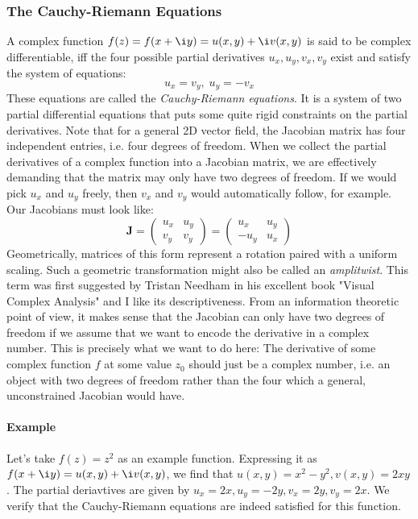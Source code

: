 \subsubsection{The Cauchy-Riemann Equations}
A complex function $f(z) = f(x + \i y) = u(x,y) + \i v(x,y)$ is said to be complex differentiable, iff the four possible partial derivatives $u_x, u_y, v_x, v_y$ exist and satisfy the system of equations:
\begin{equation}
 u_x = v_y, \; u_y = -v_x
\end{equation}
These equations are called the \emph{Cauchy-Riemann equations}. It is a system of two partial differential equations that puts some quite rigid constraints on the partial derivatives. Note that for a general 2D vector field, the Jacobian matrix has four independent entries, i.e. four degrees of freedom. When we collect the partial derivatives of a complex function into a Jacobian matrix, we are effectively demanding that the matrix may only have two degrees of freedom. If we would pick $u_x$ and $u_y$ freely, then $v_x$ and $v_y$ would automatically follow, for example. Our Jacobians must look like:
\begin{equation}
 \mathbf{J} = \begin{pmatrix} u_x & u_y \\	 v_y & v_y \end{pmatrix}
            = \begin{pmatrix} u_x & u_y \\	-u_y & u_x \end{pmatrix}
\end{equation}
Geometrically, matrices of this form represent a rotation paired with a uniform scaling. Such a geometric transformation might also be called an \emph{amplitwist}. This term was first suggested by Tristan Needham in his excellent book "Visual Complex Analysis" and I like its descriptiveness. From an information theoretic point of view, it makes sense that the Jacobian can only have two degrees of freedom if we assume that we want to encode the derivative in a complex number. This is precisely what we want to do here: The derivative of some complex function $f$ at some value $z_0$ should just be a complex number, i.e. an object with two degrees of freedom rather than the four which a general, unconstrained Jacobian would have.

\paragraph{Example} Let's take $f(z) = z^2$ as an example function. Expressing it as $f(x + \i y) = u(x,y) + \i v(x,y)$, we find that $u(x,y) = x^2 - y^2, v(x,y) = 2 x y$. The partial deriavtives are given by $u_x = 2 x, u_y = - 2 y, v_x = 2 y, v_y = 2 x$. We verify that the Cauchy-Riemann equations are indeed satisfied for this function.


